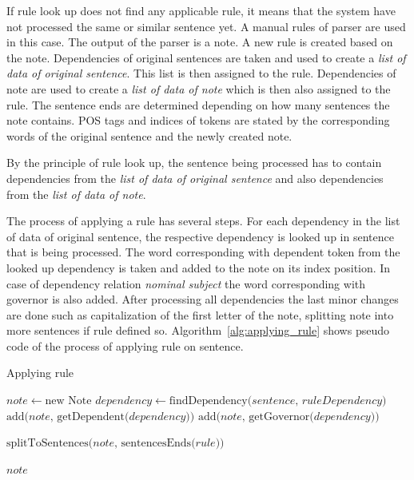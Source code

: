 \documentclass{iitsrc}
\begin{document}
		If rule look up does not find any applicable rule, it means that the system have not processed the same or similar sentence yet. A manual rules of parser are used in this case. The output of the parser is a note. A new rule is created based on the note. Dependencies of original sentences are taken and used to create a \textit{list of data of original sentence}. This list is then assigned to the rule. Dependencies of note are used to create a \textit{list of data of note} which is then also assigned to the rule. The sentence ends are determined depending on how many sentences the note contains. POS tags and indices of tokens are stated by the corresponding words of the original sentence and the newly created note.
		
		By the principle of rule look up, the sentence being processed has to contain dependencies from the \textit{list of data of original sentence} and also dependencies from the \textit{list of data of note}.
	
		The process of applying a rule has several steps. For each dependency in the list of data of original sentence, the respective dependency is looked up in sentence that is being processed. The word corresponding with dependent token from the looked up dependency is taken and added to the note on its index position. In case of dependency relation \textit{nominal subject} the word corresponding with governor is also added. After processing all dependencies the last minor changes are done such as capitalization of the first letter of the note, splitting note into more sentences if rule defined so. Algorithm~\ref{alg:applying_rule} shows pseudo code of the process of applying rule on sentence.
	
		\begin{algorithm}
			\caption{Applying rule}\label{alg:applying_rule}
			\begin{algorithmic}[1]
				\State $note \gets \text{new Note}$
				\State $dependency \gets \text{findDependency(} sentence \text{, } ruleDependency \text{)}$
				\State $\text{add(} note \text{, getDependent(} dependency \text{))}$
				\State $\text{add(} note \text{, getGovernor(} dependency \text{))}$
				\EndIf
				\EndIf
				\EndFor
				
				\State $\text{splitToSentences(} note \text{, sentencesEnds(} rule \text{))}$	
				
				\Return $note$
				\EndProcedure
			\end{algorithmic}
		\end{algorithm}
	
\end{document}
